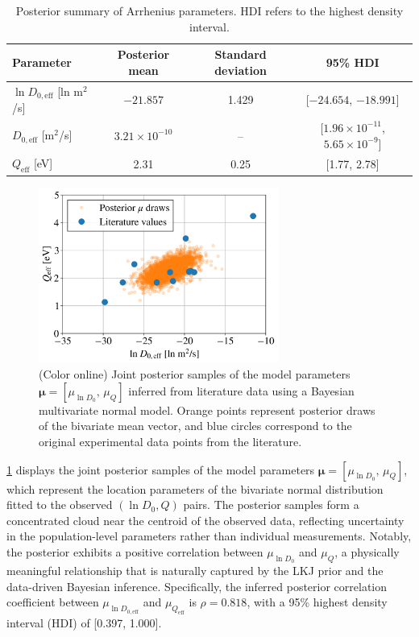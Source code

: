\documentclass[%
preprint,
amsmath,amssymb,
aps,
]{revtex4-2}
\newcommand{\?}{\stackrel{?}{=}}
\begin{document}
\begin{table}[b]
\centering
\caption{Posterior summary of Arrhenius parameters. HDI refers to the highest density interval.}
\label{Tab:Posterior}
\begin{tabular}{lccc}
\hline
Parameter & Posterior mean & Standard deviation & 95\% HDI \\
\hline
$\ln D_{0,\text{eff}}$ [ln m$^2$/s] & $-21.857$ & 1.429 & [$-24.654$, $-18.991$] \\
$D_{0,\text{eff}}$ [m$^2$/s] & $3.21 \times 10^{-10}$ & -- & [$1.96 \times 10^{-11}$, $5.65 \times 10^{-9}$] \\
$Q_\text{eff}$ [eV] & 2.31 & 0.25 & [1.77, 2.78] \\
\hline
\end{tabular}
\end{table}

\begin{figure}[h!]
\centering
\includegraphics[width=0.7\textwidth]{JointPosterior.png}
\caption{(Color online) Joint posterior samples of the model parameters $\boldsymbol{\mu} = [\mu_{\ln D_0},\, \mu_Q]$ inferred from literature data using a Bayesian multivariate normal model. Orange points represent posterior draws of the bivariate mean vector, and blue circles correspond to the original experimental data points from the literature.}
\label{Fig:JointPosterior}
\end{figure}

\cref{Fig:JointPosterior} displays the joint posterior samples of the model parameters $\boldsymbol{\mu} = [\mu_{\ln D_0},\, \mu_Q]$, which represent the location parameters of the bivariate normal distribution fitted to the observed $(\ln D_0, Q)$ pairs. The posterior samples form a concentrated cloud near the centroid of the observed data, reflecting uncertainty in the population-level parameters rather than individual measurements. Notably, the posterior exhibits a positive correlation between $\mu_{\ln D_0}$ and $\mu_Q$, a physically meaningful relationship that is naturally captured by the LKJ prior and the data-driven Bayesian inference. Specifically, the inferred posterior correlation coefficient between $\mu_{\ln D_{0,\text{eff}}}$ and $\mu_{Q_\text{eff}}$ is $\rho = 0.818$, with a 95\% highest density interval (HDI) of [0.397, 1.000]. 
\end{document}
